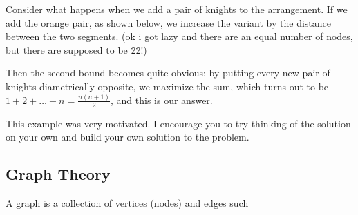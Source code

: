 \documentclass[11pt]{scrartcl}
\theoremstyle{plain} %
\theoremstyle{definition}
\theoremstyle{remark}
\theoremstyle{empty}
\theoremstyle{empty}
\theoremstyle{empty}
\theoremstyle{empty}
\theoremstyle{empty}
\theoremstyle{empty}
\begin{document}
Consider what happens when we add a pair of knights to the arrangement. If we add the orange pair, as shown below, we increase the variant by the distance between the two segments. (ok i got lazy and there are an equal number of nodes, but there are supposed to be 22!)

\begin{center}
\end{center}

Then the second bound becomes quite obvious: by putting every new pair of knights diametrically opposite, we maximize the sum, which turns out to be $1 + 2 + \ldots + n = \frac{n(n+1)}{2}$, and this is our answer.

This example was very motivated. I encourage you to try thinking of the solution on your own and build your own solution to the problem.

\begin{problem}[2025 USAMO 6]

\end{problem}

\begin{problem}[]

\end{problem}

\subsection{Graph Theory}

\begin{definition}[Graph]
A graph is a collection of vertices (nodes) and edges such 
\end{definition}
\end{document}
